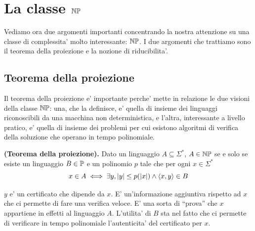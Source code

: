 %
%
%
%
\chapter{La classe $\mathbb{NP}$}

Vediamo ora due argomenti importanti concentrando la nostra attenzione su una classe di complessita'
molto interessante: $\mathbb{NP}$. I due argomenti che trattiamo sono il teorema della proiezione e la
nozione di riducibilita'.

\section{Teorema della proiezione}

Il teorema della proiezione e' importante perche' mette in relazione le due visioni della classe
$\mathbb{NP}$: una, che la definisce, e' quella di insieme dei linguaggi riconoscibili da una macchina
non deterministica, e l'altra, interessante a livello pratico, e' quella di insieme dei problemi per
cui esistono algoritmi di verifica della soluzione che operano in tempo polinomiale.

\begin{thm}
    \textbf{(Teorema della proiezione).} Dato un linguaggio $A \subseteq \Sigma^{*}$, $A \in
    \mathbb{NP}$ se e solo se esiste un linguaggio $B \in \mathbb{P}$ e un polinomio $p$ tale che per ogni
    $x \in \Sigma^{*}$
    \begin{equation*}
        x \in A \iff \exists y, |y| \leq p(|x|) \land \langle x, y \rangle \in B
    \end{equation*}
\end{thm}

$y$ e' un certificato che dipende da $x$. E' un'informazione aggiuntiva rispetto ad $x$ che ci
permette di fare una verifica veloce. E' una sorta di ``prova'' che $x$ appartiene in effetti al
linguaggio $A$. L'utilita' di $B$ sta nel fatto che ci permette di verificare in tempo polinomiale
l'autenticita' del certificato per $x$.

